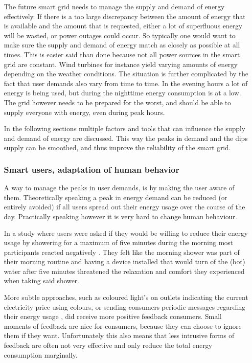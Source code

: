 The future smart grid needs to manage the supply and demand of energy effectively. If there is a too large discrepancy between the amount of energy that is available and the amount that is requested, either a lot of superfluous energy will be wasted, or power outages could occur.
So typically one would want to make sure the supply and demand of energy match as closely as possible at all times. This is easier said than done because not all power sources in the smart grid are constant. Wind turbines for instance yield varying amounts of energy depending on the weather conditions. The situation is further complicated by the fact that user demands also vary from time to time. In the evening hours a lot of energy is being used, but during the nighttime energy consumption is at a low. The grid however needs to be prepared for the worst, and should be able to supply everyone with energy, even during peak hours.

In the following sections multiple factors and tools that can influence the supply and demand of energy are discussed. This way the peaks in demand and the dips supply can be smoothed, and thus improve the reliability of the smart grid.

\subsubsection{Smart users, adaptation of human behavior}

A way to manage the peaks in user demands, is by making the user aware of them. Theoretically speaking a peak in energy demand can be reduced (or entirely avoided) if all users spread out their energy usage over the course of the day. Practically speaking however it is very hard to change human behaviour.

In a study where users were asked if they would be willing to reduce their energy usage by showering for a maximum of five minutes during the morning most participants reacted negatively \cite{golden2014smart}. They felt like the morning shower was part of their morning routine and having a device installed that would turn of the (hot) water after five minutes threatened the relaxation and comfort they experienced when taking said shower. 

More subtle approaches, such as coloured light's on outlets indicating the current electricity price using colours, or sending consumers periodic messages regarding their energy usage \cite{ayres2009evidence}, did receive more positive feedback consumers. Small moments of feedback are nice for consumers, because they can choose to ignore them if they want. Unfortunately this also means that less intrusive forms of feedback are often not very effective and only reduce the total energy consumption marginally.

